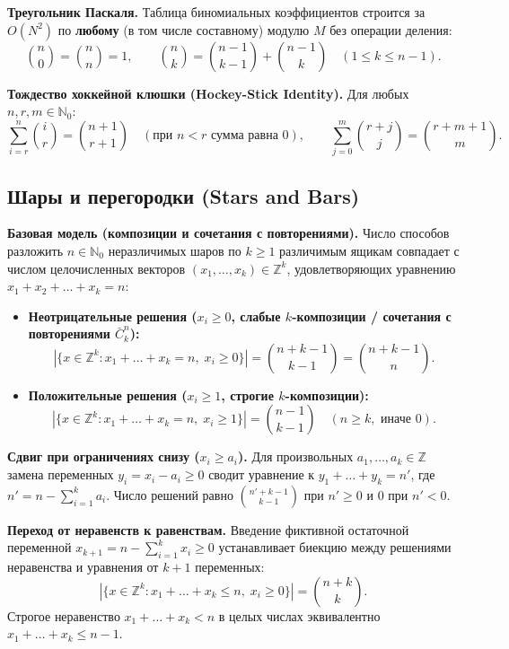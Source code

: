 \documentclass[10pt,a4paper]{article}
\renewcommand{\le}{\leqslant}
\renewcommand{\ge}{\geqslant}
\newcommand{\N}{\mathbb{N}}
\newcommand{\Z}{\mathbb{Z}}
\begin{document}
\textbf{Треугольник Паскаля.} Таблица биномиальных коэффициентов строится за $O(N^2)$ по \textbf{любому} (в том числе составному) модулю $M$ без операции деления:
\[
  \binom{n}{0} = \binom{n}{n} = 1, \qquad \binom{n}{k} = \binom{n-1}{k-1} + \binom{n-1}{k} \quad (1 \le k \le n - 1).
\]

\textbf{Тождество хоккейной клюшки (Hockey-Stick Identity).} Для любых $n, r, m \in \N_0$:
\[
  \sum_{i=r}^{n} \binom{i}{r} = \binom{n+1}{r+1} \quad (\text{при } n < r \text{ сумма равна } 0), \qquad
  \sum_{j=0}^{m} \binom{r+j}{j} = \binom{r+m+1}{m}.
\]

\subsection{Шары и перегородки (Stars and Bars)}

\textbf{Базовая модель (композиции и сочетания с повторениями).} Число способов разложить $n \in \N_0$ неразличимых шаров по $k \ge 1$ различимым ящикам совпадает с числом целочисленных векторов $(x_1, \dots, x_k) \in \Z^k$, удовлетворяющих уравнению $x_1 + x_2 + \dots + x_k = n$:
\begin{itemize}
  \item \textbf{Неотрицательные решения ($x_i \ge 0$, слабые $k$-композиции / сочетания с повторениями $\bar{C}_k^n$):}
  \[
    |\{x \in \Z^k : x_1 + \dots + x_k = n,\; x_i \ge 0\}| = \binom{n + k - 1}{k - 1} = \binom{n + k - 1}{n}.
  \]
  \item \textbf{Положительные решения ($x_i \ge 1$, строгие $k$-композиции):}
  \[
    |\{x \in \Z^k : x_1 + \dots + x_k = n,\; x_i \ge 1\}| = \binom{n - 1}{k - 1} \quad (n \ge k, \text{ иначе } 0).
  \]
\end{itemize}

\textbf{Сдвиг при ограничениях снизу ($x_i \ge a_i$).} Для произвольных $a_1, \dots, a_k \in \Z$ замена переменных $y_i = x_i - a_i \ge 0$ сводит уравнение к $y_1 + \dots + y_k = n'$, где $n' = n - \sum_{i=1}^k a_i$. Число решений равно $\binom{n' + k - 1}{k - 1}$ при $n' \ge 0$ и $0$ при $n' < 0$.

\textbf{Переход от неравенств к равенствам.} Введение фиктивной остаточной переменной $x_{k+1} = n - \sum_{i=1}^k x_i \ge 0$ устанавливает биекцию между решениями неравенства и уравнения от $k + 1$ переменных:
\[
  |\{x \in \Z^k : x_1 + \dots + x_k \le n,\; x_i \ge 0\}| = \binom{n + k}{k}.
\]
Строгое неравенство $x_1 + \dots + x_k < n$ в целых числах эквивалентно $x_1 + \dots + x_k \le n - 1$.
\end{document}
